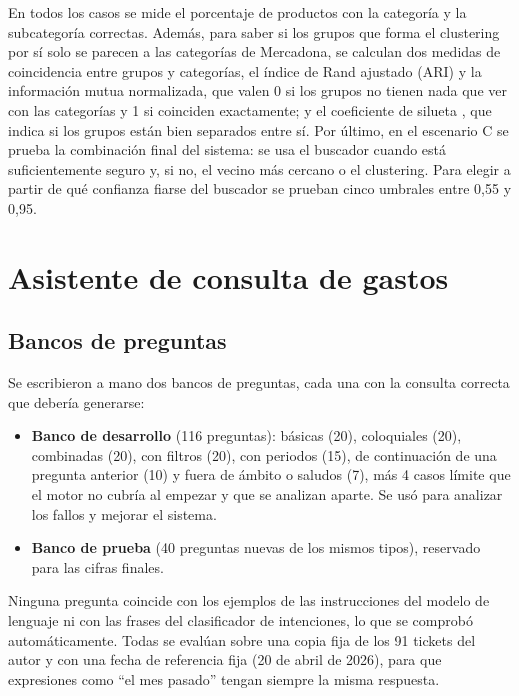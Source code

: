 En todos los casos se mide el porcentaje de productos con la categoría y la subcategoría correctas. Además, para saber si los grupos que forma el clustering por sí solo se parecen a las categorías de Mercadona, se calculan dos medidas de coincidencia entre grupos y categorías, el índice de Rand ajustado (ARI) \parencite{hubert1985comparing} y la información mutua normalizada, que valen 0 si los grupos no tienen nada que ver con las categorías y 1 si coinciden exactamente; y el coeficiente de silueta \parencite{rousseeuw1987silhouettes}, que indica si los grupos están bien separados entre sí. Por último, en el escenario C se prueba la combinación final del sistema: se usa el buscador cuando está suficientemente seguro y, si no, el vecino más cercano o el clustering. Para elegir a partir de qué confianza fiarse del buscador se prueban cinco umbrales entre 0,55 y 0,95.

\section{Asistente de consulta de gastos}
\label{s:val-chat}

\subsection{Bancos de preguntas}
Se escribieron a mano dos bancos de preguntas, cada una con la consulta correcta que debería generarse:

\begin{itemize}
    \item \textbf{Banco de desarrollo} (116 preguntas): básicas (20), coloquiales (20), combinadas (20), con filtros (20), con periodos (15), de continuación de una pregunta anterior (10) y fuera de ámbito o saludos (7), más 4 casos límite que el motor no cubría al empezar y que se analizan aparte. Se usó para analizar los fallos y mejorar el sistema.
    \item \textbf{Banco de prueba} (40 preguntas nuevas de los mismos tipos), reservado para las cifras finales.
\end{itemize}

Ninguna pregunta coincide con los ejemplos de las instrucciones del modelo de lenguaje ni con las frases del clasificador de intenciones, lo que se comprobó automáticamente. Todas se evalúan sobre una copia fija de los 91 tickets del autor y con una fecha de referencia fija (20 de abril de 2026), para que expresiones como \enquote{el mes pasado} tengan siempre la misma respuesta.

